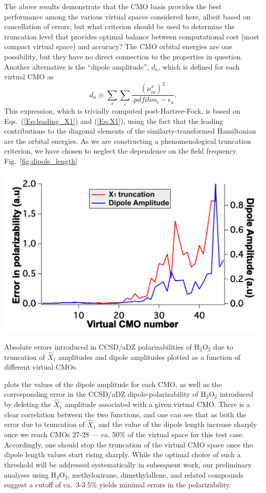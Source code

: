 The above results demonstrate that the CMO basis provides the best performance
among the various virtual spaces considered here, albeit based on cancellation
of errors, but what criterion should be used to determine the truncation level
that provides optimal balance between computational cost (most compact virtual
space) and accuracy?  The CMO orbital energies are one possibility, but they
have no direct connection to the properties in question.  Another alternative
is the ``dipole amplitude'', $d_a$, which is defined for each virtual CMO as
\begin{equation}
d_a \equiv \sum\limits_x\sum\limits_i\frac{({\mu^x_{ia}})^2}{.pdfilon_i - \epsilon_a}.
\label{Eq:dipole}
\end{equation}
This expression, which is trivially computed post-Hartree-Fock, is based on
Eqs.~(\ref{Eq:leading_X1}) and (\ref{Eq:X1}), using the fact that the leading
contributions to the diagonal elements of the similarty-transformed
Hamiltonian are the orbital energies.    As we are constructing a
phenomenological truncation criterion, we have chosen to neglect the
dependence on the field frequency.
Fig.~\ref{fig:dipole_length} 
\begin{MyFigure}[h!]
\centering
\includegraphics[width=0.6\linewidth,natwidth=610,natheight=642]{figures_fvno/diplength.pdf}
\caption{{\footnotesize Absolute errors introduced in CCSD/aDZ
  polarizabilities of H$_2$O$_2$ due to truncation of $\hat{X}_1$ amplitudes and
  dipole amplitudes plotted as a function of different virtual CMOs.}}
\label{fig:dipole_length}
\end{MyFigure}
plots the values of the dipole amplitude for
each CMO, as well as the corresponding error in the CCSD/aDZ
dipole-polarizability of H$_2$O$_2$ introduced by deleting the $\hat{X}_1$
amplitude associated with a given virtual CMO. There is a clear correlation
between the two functions, and one can see that as both the error due to
truncation of $\hat{X}_1$ and the value of the dipole length increase sharply
once we reach CMOs 27-28 --- ca. 50\% of the virtual space for this test case.
Accordingly, one should stop the truncation of the virtual CMO space once the
dipole length values start rising sharply.  While the optimal choice of
such a threshold will be addressed systematically in subsequent work, our
preliminary analyses using H$_2$O$_2$, methyloxirane, dimethylallene, and
related compounds suggest a cutoff of ca.\ 3-3.5\% yields minimal errors
in the polarizability.

